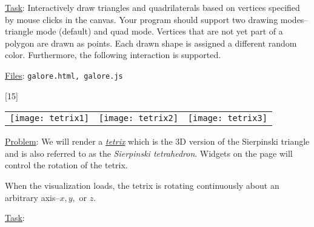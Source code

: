 \documentclass[addpoints]{exam}
\begin{document}
\begin{questions}
  \underline{Task}: Interactively draw triangles and quadrilaterals based on vertices specified by mouse clicks in the canvas. Your program should support two drawing modes--triangle mode (default) and quad mode. Vertices that are not yet part of a polygon are drawn as points. Each drawn shape is assigned a different random color. Furthermore, the following interaction is supported.
  \underline{Files}: {\tt galore.html, galore.js}

[15]

  \begin{tabular}{ccc}
    \texttt{[image: tetrix1]}
    & \texttt{[image: tetrix2]}
    & \texttt{[image: tetrix3]}
  \end{tabular}

  \underline{Problem}: We will render a \href{http://mathworld.wolfram.com/Tetrix.html}{\it tetrix} which is the 3D version of the Sierpinski triangle and is also referred to as the \textit{Sierpinski tetrahedron}. Widgets on the page will control the rotation of the tetrix.

  When the visualization loads, the tetrix is rotating continuously about an arbitrary axis--$x, y,$ or $z$. 

  \underline{Task}:
\end{questions}
\end{document}
